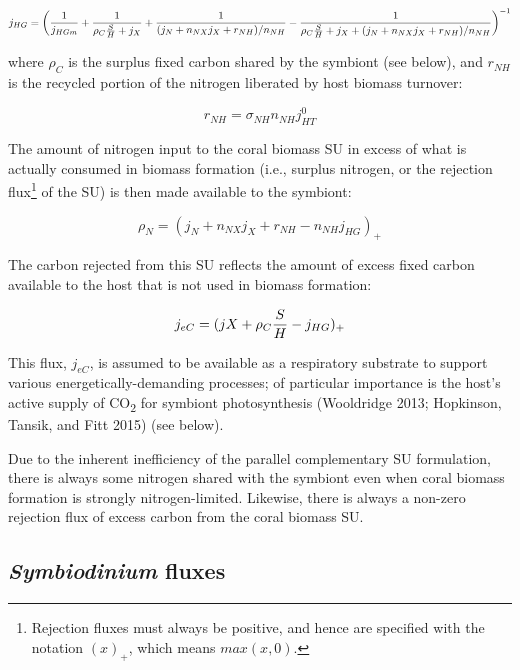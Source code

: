 \documentclass[]{elsarticle} %
\begin{document}
\begin{equation} j_{HG} = \bigg({1 \over j_{HGm}} + {1 \over {\rho_C{S \over H} + j_X}} + {1 \over {(j_N + n_{NX}j_X + r_{NH}) / n_{NH}}} - {1 \over {{\rho_C{S \over H} + j_X} + (j_N + n_{NX}j_X + r_{NH}) / n_{NH}}}\bigg)^{-1} \end{equation}

where \(\rho_C\) is the surplus fixed carbon shared by the symbiont (see
below), and \(r_{NH}\) is the recycled portion of the nitrogen liberated
by host biomass turnover:

\begin{equation} r_{NH}=\sigma_{NH}n_{NH}j_{HT}^0 \end{equation}

The amount of nitrogen input to the coral biomass SU in excess of what
is actually consumed in biomass formation (i.e., surplus nitrogen, or
the rejection flux\footnote{Rejection fluxes must always be positive,
  and hence are specified with the notation \((x)_+\), which means
  \(max(x, 0)\).} of the SU) is then made available to the symbiont:

\begin{equation} \rho_N = (j_N + n_{NX}j_X + r_{NH} - n_{NH}j_{HG})_+ \end{equation}

The carbon rejected from this SU reflects the amount of excess fixed
carbon available to the host that is not used in biomass formation:

\begin{equation} j_{eC} = (jX + \rho_C{S \over H} - j_{HG})_+ \end{equation}

This flux, \(j_{eC}\), is assumed to be available as a respiratory
substrate to support various energetically-demanding processes; of
particular importance is the host's active supply of CO\textsubscript{2}
for symbiont photosynthesis (Wooldridge 2013; Hopkinson, Tansik, and
Fitt 2015) (see below).

Due to the inherent inefficiency of the parallel complementary SU
formulation, there is always some nitrogen shared with the symbiont even
when coral biomass formation is strongly nitrogen-limited. Likewise,
there is always a non-zero rejection flux of excess carbon from the
coral biomass SU.

\subsection{\texorpdfstring{\emph{Symbiodinium}
fluxes}{Symbiodinium fluxes}}\label{symbiodinium-fluxes}
\end{document}
